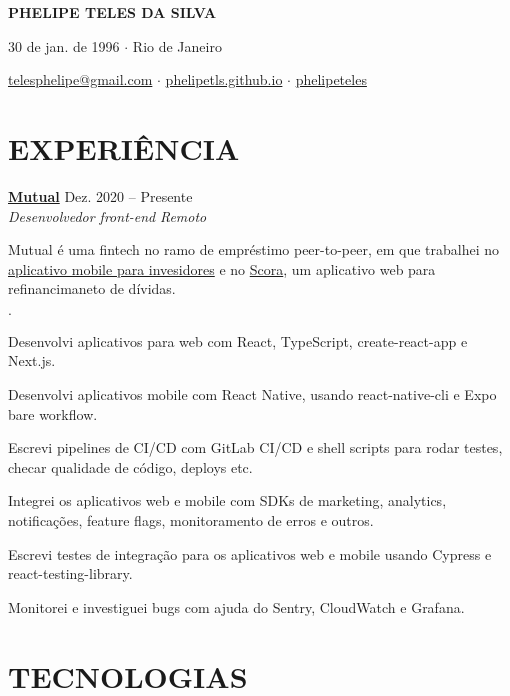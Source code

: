 \documentclass[12pt]{article}
\newenvironment{tightlist}
  {\begin{list}
    {$\cdot$}
    {
      \setlength{\leftmargin}{0em}
      \setlength{\itemsep}{\smallskipamount}
    }
  }
{\end{list}}
\begin{document}
\pagestyle{empty}

\centerline{\huge\bf PHELIPE TELES DA SILVA}
\medskip

\centerline{30 de jan. de 1996 $\cdot$ Rio de Janeiro}
\smallskip

\centerline{
  \href{mailto:telesphelipe@gmail.com}{ telesphelipe@gmail.com}
  $\cdot$
  \href{https://phelipetls.github.io}{ phelipetls.github.io}
  $\cdot$
  \href{https://linkedin.com/in/phelipeteles}{ phelipeteles}
}
\smallskip

\section*{EXPERIÊNCIA}

\textbf{\href{https://mutual.club}{Mutual}} \hfill Dez. 2020 -- Presente \\
\textit{Desenvolvedor front-end} \hfill \textit{Remoto} {\parfillskip=0pt\par}

Mutual é uma fintech no ramo de empréstimo peer-to-peer, em que trabalhei no
\href{https://mutual.club/en/invest.html}{aplicativo mobile para invesidores} e
no \href{https://scora.com.br/}{Scora}, um aplicativo web para refinancimaneto
de dívidas.

\begin{tightlist}
  \item Desenvolvi aplicativos para web com React, TypeScript, create-react-app
    e Next.js.
  \item Desenvolvi aplicativos mobile com React Native, usando react-native-cli
    e Expo bare workflow.
  \item Escrevi pipelines de CI/CD com GitLab CI/CD e shell scripts para rodar
    testes, checar qualidade de código, deploys etc.
  \item Integrei os aplicativos web e mobile com SDKs de marketing, analytics,
    notificações, feature flags, monitoramento de erros e outros.
  \item Escrevi testes de integração para os aplicativos web e mobile usando
    Cypress e react-testing-library.
  \item Monitorei e investiguei bugs com ajuda do Sentry, CloudWatch e Grafana.
\end{tightlist}

\section*{TECNOLOGIAS}
\end{document}
